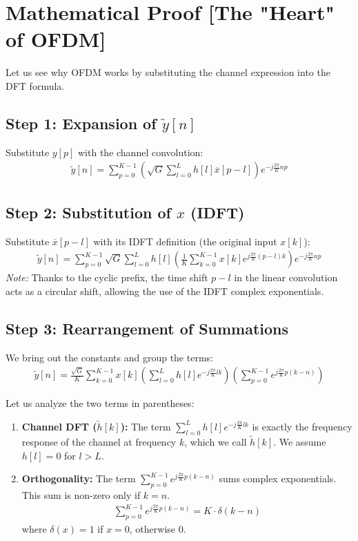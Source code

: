 \documentclass[a4paper, 12pt]{book}
\begin{document}
\section{Mathematical Proof [The "Heart" of OFDM]}

Let us see why OFDM works by substituting the channel expression into the DFT formula.

\subsection{Step 1: Expansion of $\tilde{y}[n]$}
Substitute $y[p]$ with the channel convolution:
\begin{align}
\tilde{y}[n] = \sum_{p=0}^{K-1} \left( \sqrt{G} \sum_{l=0}^{L} h[l] \overline{x}[p-l] \right) e^{-j \frac{2\pi}{K} np}
\end{align}

\subsection{Step 2: Substitution of $x$ (IDFT)}
Substitute $\overline{x}[p-l]$ with its IDFT definition (the original input $x[k]$):
\begin{align}
\tilde{y}[n] = \sum_{p=0}^{K-1} \sqrt{G} \sum_{l=0}^{L} h[l] \left( \frac{1}{K} \sum_{k=0}^{K-1} x[k] e^{j \frac{2\pi}{K} (p-l)k} \right) e^{-j \frac{2\pi}{K} np}
\end{align}
\textit{Note:} Thanks to the cyclic prefix, the time shift $p-l$ in the linear convolution acts as a circular shift, allowing the use of the IDFT complex exponentials.

\subsection{Step 3: Rearrangement of Summations}
We bring out the constants and group the terms:
\begin{align}
\tilde{y}[n] = \frac{\sqrt{G}}{K} \sum_{k=0}^{K-1} x[k] \left( \sum_{l=0}^{L} h[l] e^{-j \frac{2\pi}{K} lk} \right) \left( \sum_{p=0}^{K-1} e^{j \frac{2\pi}{K} p(k-n)} \right)
\end{align}

Let us analyze the two terms in parentheses:
\begin{enumerate}
    \item \textbf{Channel DFT ($\tilde{h}[k]$):} The term $\sum_{l=0}^{L} h[l] e^{-j \frac{2\pi}{K} lk}$ is exactly the frequency response of the channel at frequency $k$, which we call $\tilde{h}[k]$. We assume $h[l]=0$ for $l>L$.
    \item \textbf{Orthogonality:} The term $\sum_{p=0}^{K-1} e^{j \frac{2\pi}{K} p(k-n)}$ sums complex exponentials. This sum is non-zero only if $k=n$.
    \begin{align}
    \sum_{p=0}^{K-1} e^{j \frac{2\pi}{K} p(k-n)} = K \cdot \delta(k-n)
    \end{align}
    where $\delta(x) = 1$ if $x=0$, otherwise $0$.
\end{enumerate}
\end{document}
